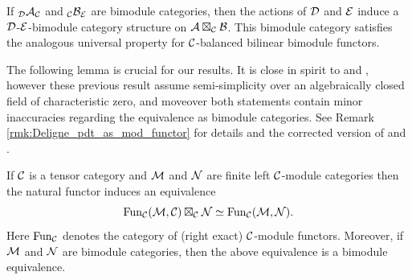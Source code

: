 \documentclass{amsart}
\begin{document}
\begin{remark}
	If ${}_{\mathcal D}\mathcal A_{\mathcal C}$ and ${}_{\mathcal C}\mathcal B_{\mathcal E}$ are bimodule categories, then the actions of $\mathcal D$ and $\mathcal E$ induce a $\mathcal D$-$\mathcal E$-bimodule category structure on $\mathcal A \boxtimes_{\mathcal C} \mathcal B$. This bimodule category satisfies the analogous universal property for $\mathcal C$-balanced bilinear bimodule functors. 
\end{remark}

The following lemma is crucial for our results. It is close in spirit to \cite[Prop. 3.5 and Rmk. 3.6]{0909.3140} and \cite[Thm. 3.20]{0911.4979}, however these previous result assume semi-simplicity over an algebraically closed field of characteristic zero, and moveover both statements contain minor inaccuracies regarding the equivalence as bimodule categories. See Remark \ref{rmk:Deligne_pdt_as_mod_functor} for details and the corrected version of \cite[Rmk. 3.6]{0909.3140} and \cite[Thm. 3.20]{0911.4979}.

\begin{lemma} \label{Lma:FunctorsAsATensorPdt}
	If $\mathcal C$ is a tensor category and $\mathcal M$ and $\mathcal N$ are finite left $\mathcal C$-module categories then the natural functor induces an equivalence
	\begin{equation*}
		\operatorname{Fun}_\mathcal C(\mathcal M, \mathcal C) \boxtimes_\mathcal C \mathcal N \simeq \operatorname{Fun}_\mathcal C(\mathcal M,\mathcal N).
	\end{equation*}
	Here $\operatorname{Fun}_\mathcal C$ denotes the category of (right exact) $\mathcal C$-module functors. 
	Moreover, if $\mathcal M$ and $\mathcal N$ are bimodule categories, then the above equivalence is a bimodule equivalence. 
\end{lemma}
\end{document}
